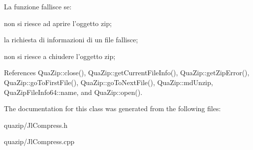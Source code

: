 La funzione fallisce se\-:
\begin{DoxyItemize}
\item non si riesce ad aprire l'oggetto zip;
\item la richiesta di informazioni di un file fallisce;
\item non si riesce a chiudere l'oggetto zip; 
\end{DoxyItemize}

References Qua\-Zip\-::close(), Qua\-Zip\-::get\-Current\-File\-Info(), Qua\-Zip\-::get\-Zip\-Error(), Qua\-Zip\-::go\-To\-First\-File(), Qua\-Zip\-::go\-To\-Next\-File(), Qua\-Zip\-::md\-Unzip, Qua\-Zip\-File\-Info64\-::name, and Qua\-Zip\-::open().



The documentation for this class was generated from the following files\-:\begin{DoxyCompactItemize}
\item 
quazip/Jl\-Compress.\-h\item 
quazip/Jl\-Compress.\-cpp\end{DoxyCompactItemize}
